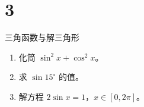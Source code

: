 \chapter{3}{三角函数与解三角形}

\begin{enumerate}
  \item 化简 $\sin^2 x+\cos^2 x$。
  \item 求 $\sin 15^\circ$ 的值。
  \item 解方程 $2\sin x=1$，$x\in[0,2\pi]$。
\end{enumerate}

